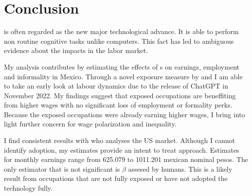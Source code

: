 \section{Conclusion}

 is often regarded as the new major technological advance. It is able to perform non routine cognitive tasks unlike computers. This fact has led to ambiguous evidence about the impacts in the labor market. \cite{hui2024short,Dang,humlum}

My analysis contributes by estimating the effects of s on earnings, employment and informality in Mexico. Through a novel exposure measure by \cite{martinez2024risk} and  I am able to take an early look at labour dynamics due to the release of ChatGPT in November 2022. My findings suggest that exposed occupations are beneffiting from higher wages with no significant loss of employment or formality perks. Because the exposed occupations were already earning higher wages, I bring into light further concern for wage polarization and inequality.

I find consistent results with \cite{Dang} who analyses the US market. Although I cannot identify adoption, my estimates provide an intent to treat approach. Estimates for monthly earnings range from 625.079 to 1011.201 mexican nominal pesos. The only estimator that is not significant is $\beta$ assesed by humans. This is a likely result from occupations that are not fully exposed or have not adopted the technology fully.





